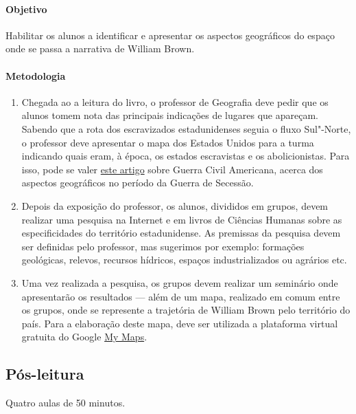 \documentclass[12pt]{extarticle}
\begin{document}
 \paragraph{Objetivo} Habilitar os alunos a identificar e apresentar 
 os aspectos geográficos do espaço onde se passa a narrativa de William Brown.

 \paragraph{Metodologia}
   \begin{enumerate}
    \item
    Chegada ao a leitura do livro, o professor de Geografia deve 
    pedir que os alunos tomem nota das principais indicações de lugares
    que apareçam. Sabendo que a rota dos escravizados estadunidenses seguia
    o fluxo Sul"-Norte, o professor deve apresentar o mapa dos Estados Unidos
    para a turma indicando quais eram, à época, os estados escravistas
    e os abolicionistas. Para isso, pode se valer \href{https://brasilescola.uol.com.br/historiag/guerra-secessao.htm}{este artigo} sobre Guerra Civil Americana,
    acerca dos aspectos geográficos no período da Guerra de Secessão. 
    
    \item
    Depois da exposição do professor, os alunos, divididos em grupos,
    devem realizar uma pesquisa na Internet e em livros de Ciências Humanas
    sobre as especificidades do território
    estadunidense. As premissas da pesquisa devem ser definidas pelo
    professor, mas sugerimos por exemplo: formações geológicas,
    relevos, recursos hídricos, espaços industrializados ou agrários etc.

    \item
    Uma vez realizada a pesquisa, os grupos devem realizar um seminário
    onde apresentarão os resultados --- além de um mapa, realizado em comum
    entre os grupos, onde se represente a trajetória de William Brown pelo
    território do país. Para a elaboração deste mapa, deve ser utilizada 
    a plataforma virtual gratuita do Google \href{https://www.google.com/intl/pt-BR/maps/about/mymaps/}{My Maps}.
       \end{enumerate}


\subsection{Pós-leitura} Quatro aulas de 50 minutos.
\end{document}

